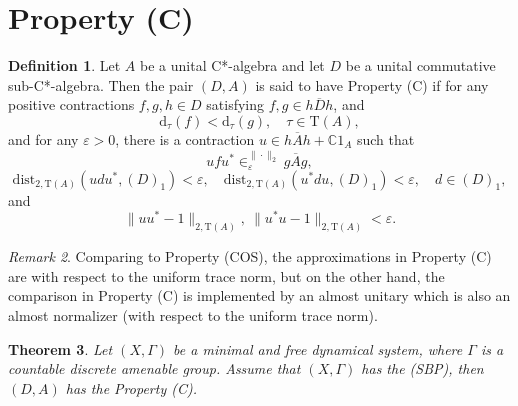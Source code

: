 \documentclass[12pt, oneside, psamsfonts]{amsart}
\newtheorem{thm}{Theorem}[section]
\theoremstyle{definition}
\newtheorem{defn}[thm]{Definition}
\theoremstyle{remark}
\newtheorem{rem}[thm]{Remark}
\numberwithin{equation}{section}
\newcommand{\norm}[1]{\| #1\|}
\newcommand{\Comp}{\mathbb C}
\newcommand{\eps}{\varepsilon}
\newcommand{\tr}{\mathrm{T}}
\begin{document}


\section{Property (C)}


\begin{defn}\label{defn-C}
Let $A$ be a unital C*-algebra and let $D$ be a unital commutative sub-C*-algebra. Then the pair $(D, A)$ is said to have Property (C) if for any positive contractions $f, g, h \in D$ satisfying $f, g \in \overline{hDh}$, and $$\mathrm{d}_\tau(f) < \mathrm{d}_\tau(g),\quad \tau \in \tr(A),$$ and for any $\eps>0$, there is a contraction $u \in \overline{hAh} + \Comp 1_A$ such that
$$ u f u^* \in_\eps^{\norm{\cdot}_2} \overline{gAg},$$
$$\mathrm{dist}_{2, \tr(A)}(udu^*, (D)_1) < \eps,\quad \mathrm{dist}_{2, \tr(A)}(u^*du, (D)_1) < \eps, \quad d \in (D)_1, $$ 
and
$$\norm{uu^* - 1}_{2, \tr(A)},\  \norm{u^*u - 1}_{2, \tr(A)} < \eps.$$
\end{defn}

\begin{rem}
Comparing to Property (COS), the approximations in Property (C) are with respect to the uniform trace norm, but on the other hand, the comparison in Property (C) is implemented by an almost unitary which is also an almost normalizer (with respect to the uniform trace norm).
\end{rem}


\begin{thm}\label{SBP=>C}
Let $(X, \Gamma)$ be a minimal and free dynamical system, where $\Gamma$ is a countable discrete amenable group.  Assume that $(X, \Gamma)$ has the (SBP), then $(D, A)$ has the Property (C).
\end{thm}
\end{document}
